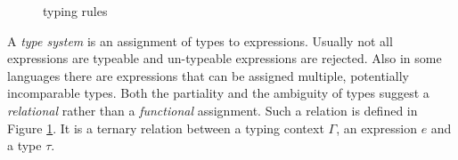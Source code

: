 {\begin{figure}[t]
  \centering
  \caption{\stlcbool typing rules}
  \label{fig:intro:stlcbooltyping}
\end{figure}

A \emph{type system} is an assignment of types to expressions. Usually not all
expressions are typeable and un-typeable expressions are rejected. Also in some
languages there are expressions that can be assigned multiple, potentially
incomparable types. Both the partiality and the ambiguity of types suggest a
\emph{relational} rather than a \emph{functional} assignment. Such a relation is
defined in Figure \ref{fig:intro:stlcbooltyping}. It is a ternary relation
 between a typing context $\Gamma$,
an expression $e$ and a type $\tau$.

}
